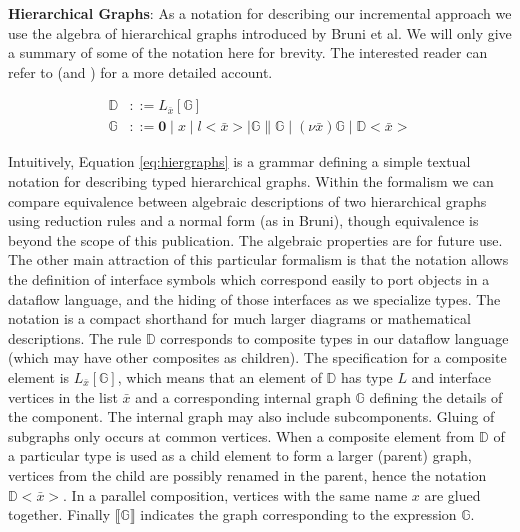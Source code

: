 
\textbf{Hierarchical Graphs}: As a notation for describing our incremental approach we use the algebra of hierarchical graphs introduced by Bruni et al\cite{graphs:hier_algebra}. We will only give a summary of some of the notation here for brevity.  The interested reader can refer to \cite{modeling:esmol_cycles_tr} (and \cite{graphs:hier_algebra}) for a more detailed account.

\begin{align}
\label{eq:hiergraphs}
\mathbb{D} &::= L_{\bar{x}} [ \mathbb{G} ]  \\
\mathbb{G} &::= \mathbf{0} \mid x \mid l<\bar{x}> \mid \mathbb{G} \parallel \mathbb{G} \mid  (\nu \bar{x})\mathbb{G} \mid \mathbb{D} <\bar{x}>  \nonumber
\end{align}

Intuitively, Equation \ref{eq:hiergraphs} is a grammar defining a simple textual notation for describing typed hierarchical graphs.  Within the formalism we can compare equivalence between algebraic descriptions of two hierarchical graphs using reduction rules and a normal form (as in Bruni\cite{graphs:hier_algebra}), though equivalence is beyond the scope of this publication. The algebraic properties are for future use. The other main attraction of this particular formalism is that the notation allows the definition of interface symbols which correspond easily to port objects in a dataflow language, and the hiding of those interfaces as we specialize types.  The notation is a compact shorthand for much larger diagrams or mathematical descriptions. The rule $\mathbb{D}$ corresponds to composite types in our dataflow language (which may have other composites as children).   The specification for a composite element is $L_{\bar{x}} [\mathbb{G} ]$, which means that an element of $\mathbb{D}$ has type $L$ and interface vertices in the list $\bar{x}$ and a corresponding internal graph $\mathbb{G}$ defining the details of the component. The internal graph may also include subcomponents. Gluing of subgraphs  only occurs at common vertices.  When a composite element from $\mathbb{D}$ of a particular type is used as a child element to form a  larger (parent) graph, vertices from the child are possibly renamed in the parent, hence the notation $\mathbb{D} <\bar{x}> $.  In a parallel composition, vertices with the same name $x$ are glued together.   Finally $\llbracket \mathbb{G} \rrbracket$ indicates the graph corresponding to the expression $\mathbb{G}$.

